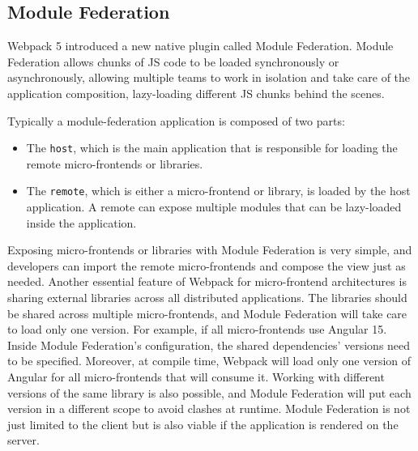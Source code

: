 \subsection{Module Federation}\label{subsection:background:micro-frontend:module-federation}

Webpack 5 introduced a new native plugin called Module Federation. Module Federation allows chunks of \ac{JS} code to be loaded synchronously or asynchronously, allowing multiple teams to work in isolation and take care of the application composition, lazy-loading different \ac{JS} chunks behind the scenes. \cite[81]{book:2021:mezzalira:applied-methods:building-micro-frontends}

\bigskip

\noindent Typically a module-federation application is composed of two parts: \cite[81]{book:2021:mezzalira:applied-methods:building-micro-frontends}

\begin{itemize}
    \item The \texttt{host}, which is the main application that is responsible for loading the remote micro-frontends or libraries.
    \item The \texttt{remote}, which is either a micro-frontend or library, is loaded by the host application. A remote can expose multiple modules that can be lazy-loaded inside the application.
\end{itemize}

\noindent Exposing micro-frontends or libraries with Module Federation is very simple, and developers can import the remote micro-frontends and compose the view just as needed. Another essential feature of Webpack for micro-frontend architectures is sharing external libraries across all distributed applications. The libraries should be shared across multiple micro-frontends, and Module Federation will take care to load only one version. For example, if all micro-frontends use Angular 15. Inside Module Federation's configuration, the shared dependencies' versions need to be specified.
\noindent Moreover, at compile time, Webpack will load only one version of Angular for all micro-frontends that will consume it. Working with different versions of the same library is also possible, and Module Federation will put each version in a different scope to avoid clashes at runtime. Module Federation is not just limited to the client but is also viable if the application is rendered on the server. \cite[82-83]{book:2021:mezzalira:applied-methods:building-micro-frontends}

